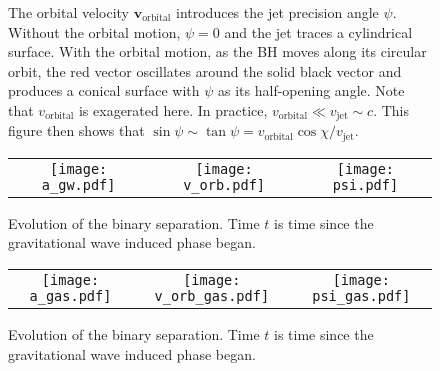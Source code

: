 \documentclass[iop]{emulateapj}
\begin{document}
\begin{figure}
  \begin{center}
  \end{center}
  \caption{The orbital velocity $\mathbf{v}_\mathrm{orbital}$
    introduces the jet precision angle $\psi$.  Without the orbital
    motion, $\psi=0$ and the jet traces a cylindrical surface.  With
    the orbital motion, as the BH moves along its circular orbit, the
    red vector oscillates around the solid black vector and produces a
    conical surface with $\psi$ as its half-opening angle.  Note that
    $v_\mathrm{orbital}$ is exagerated here.  In practice,
    $v_\mathrm{orbital}\ll v_\mathrm{jet}\sim c$.  This figure then
    shows that
    $\sin{\psi}\sim\tan{\psi}=v_\mathrm{orbital}\cos{\chi}/v_\mathrm{jet}$.}
  \label{fig:jet}
\end{figure}

\begin{figure*}
\begin{center}
  \begin{tabular}{ccc}
    \texttt{[image: a\_gw.pdf]} &
    \texttt{[image: v\_orb.pdf]} &
    \texttt{[image: psi.pdf]}
  \end{tabular}
\end{center}
\caption{Evolution of the binary separation.  Time $t$ is time since the gravitational wave induced phase began.}
\label{fig:a_gw}
\end{figure*}

\begin{figure*}
\begin{center}
  \begin{tabular}{ccc}
    \texttt{[image: a\_gas.pdf]} &
    \texttt{[image: v\_orb\_gas.pdf]} &
    \texttt{[image: psi\_gas.pdf]}
  \end{tabular}
\end{center}
\caption{Evolution of the binary separation.  Time $t$ is time since the gravitational wave induced phase began.}
\label{fig:a_gas}
\end{figure*}
\end{document}
